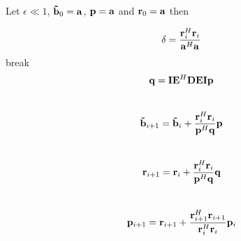 \documentclass[10pt]{article}
\begin{document}
Let $\epsilon \ll 1$, ${\bf \tilde b}_0 = {\bf a}$, ${\bf p} = {\bf a}$ and ${\bf r}_0 = {\bf a}$ then
\\

\begin{algorithmic}
  
  \STATE
  \begin{displaymath}\delta = \frac{{\bf r}^H_i{\bf r}_i}{{\bf a}^H{\bf a}}\end{displaymath}
  \IF {$\delta < \epsilon$}
  \STATE 
  break
  \ELSE
  \STATE 
  \begin{displaymath}
    {\bf q} = {\bf I}{\bf E}^H{\bf DEIp}
  \end{displaymath}\\
  \begin{displaymath}
    {\bf \tilde b}_{i+1} = {\bf \tilde b}_i + \frac{{\bf r}^H_i{\bf r}_i}{{\bf p}^H{\bf q}}{\bf p}
  \end{displaymath}\\
  \begin{displaymath}
    {\bf r}_{i+1} = {\bf r}_i + \frac{{\bf r}^H_i{\bf r}_i}{{\bf p}^H{\bf q}}{\bf q}
  \end{displaymath}\\
  \begin{displaymath}
    {\bf p}_{i+1} = {\bf r}_{i+1} + \frac{{\bf r}^H_{i+1}{\bf r}_{i+1}}{{\bf r}_i^H{\bf r}_i}{\bf p}_i
  \end{displaymath}
  \ENDIF
  
  \ENDFOR

\end{algorithmic} 
\end{document}

